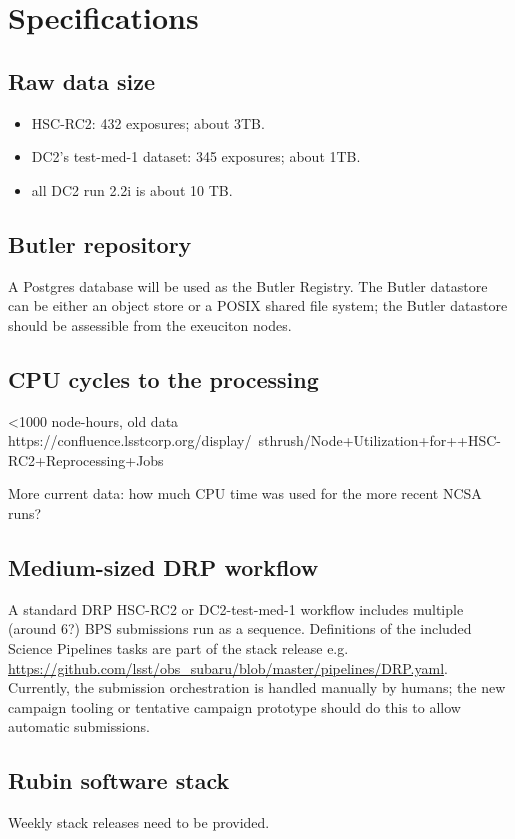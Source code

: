\section{Specifications}

\subsection{Raw data size}
\begin{itemize}
\item HSC-RC2: 432 exposures; about 3TB.
\item DC2's test-med-1 dataset: 345 exposures; about 1TB.
\item all DC2 run 2.2i is about 10 TB.
\end{itemize}

\subsection{Butler repository}
A Postgres database will be used as the Butler Registry.
The Butler datastore can be either an object store or a POSIX shared file system; the Butler datastore should be assessible from the exeuciton nodes.

\subsection{CPU cycles to the processing}
<1000 node-hours, old data https://confluence.lsstcorp.org/display/~sthrush/Node+Utilization+for++HSC-RC2+Reprocessing+Jobs

More current data: how much CPU time was used for the more recent NCSA runs?

\subsection{Medium-sized DRP workflow}
A standard DRP HSC-RC2 or DC2-test-med-1 workflow includes multiple (around 6?) BPS submissions run as a sequence.
Definitions of the included Science Pipelines tasks are part of the stack release
e.g. \url{https://github.com/lsst/obs_subaru/blob/master/pipelines/DRP.yaml}.
Currently, the submission orchestration is handled manually by humans; the new campaign tooling or tentative campaign prototype should do this to allow automatic submissions.

\subsection{Rubin software stack}
Weekly stack releases need to be provided.

